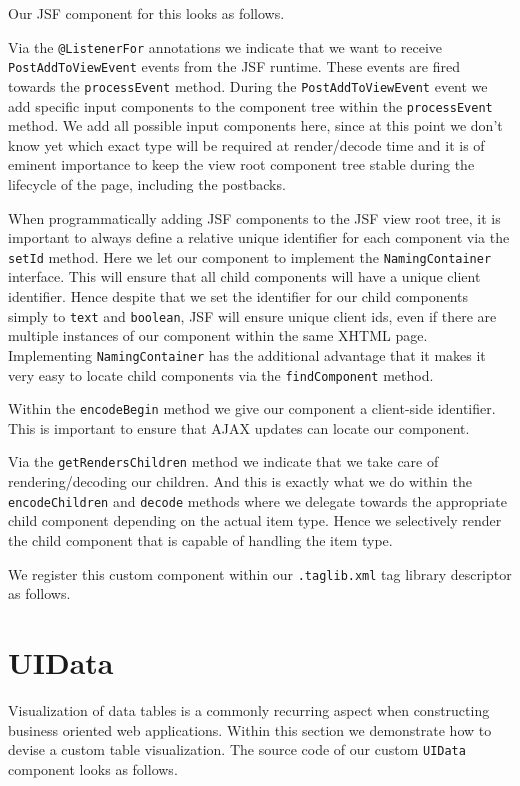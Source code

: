 Our JSF component for this looks as follows.

Via the \texttt{@ListenerFor} annotations we indicate that we want to receive \texttt{PostAddToView\allowbreak Event} events from the JSF runtime.
These events are fired towards the \texttt{processEvent} method.
During the \texttt{PostAddToViewEvent} event we add specific input components to the component tree within the \texttt{processEvent} method.
We add all possible input components here,  since at this point we don't know yet which exact type will be required at render/decode time and it is of eminent importance to keep the view root component tree stable during the lifecycle of the page, including the postbacks.

When programmatically adding JSF components to the JSF view root tree, it is important to always define a relative unique identifier for each component via the \texttt{setId} method.
Here we let our component to implement the \texttt{NamingContainer} interface.
This will ensure that all child components will have a unique client identifier.
Hence despite that we set the identifier for our child components simply to \texttt{text} and \texttt{boolean}, JSF will ensure unique client ids, even if there are multiple instances of our component within the same XHTML page.
Implementing \texttt{NamingContainer} has the additional advantage that it makes it very easy to locate child components via the \texttt{findComponent} method.

Within the \texttt{encodeBegin} method we give our component a client-side identifier.
This is important to ensure that AJAX updates can locate our component.

Via the \texttt{getRendersChildren} method we indicate that we take care of rendering/decoding our children.
And this is exactly what we do within the \texttt{encodeChildren} and \texttt{decode} methods where we delegate towards the appropriate child component depending on the actual item type.
Hence we selectively render the child component that is capable of handling the item type.

We register this custom component within our \texttt{.taglib.xml} tag library descriptor as follows.



\section{UIData}
Visualization of data tables is a commonly recurring aspect when constructing business oriented web applications.
Within this section we demonstrate how to devise a custom table visualization.
The source code of our custom \texttt{UIData} component looks as follows.


